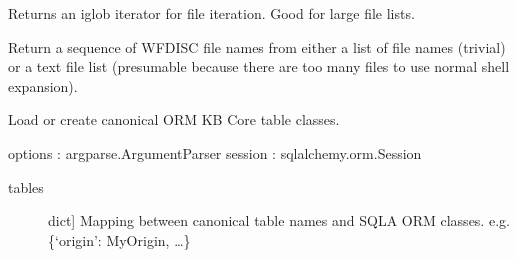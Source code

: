 \documentclass[letterpaper,10pt,english]{sphinxmanual}
\begin{document}

\begin{fulllineitems}
\label{\detokenize{infrapy.utils:infrapy.utils.files2db.dicts2rows}}
\end{fulllineitems}


\begin{fulllineitems}
\label{\detokenize{infrapy.utils:infrapy.utils.files2db.expand_glob}}
Returns an iglob iterator for file iteration. Good for large file lists.

\end{fulllineitems}


\begin{fulllineitems}
\label{\detokenize{infrapy.utils:infrapy.utils.files2db.get_files}}
Return a sequence of WFDISC file names from either a list of file names
(trivial) or a text file list (presumable because there are too many files
to use normal shell expansion).

\end{fulllineitems}


\begin{fulllineitems}
\label{\detokenize{infrapy.utils:infrapy.utils.files2db.get_or_create_tables}}
Load or create canonical ORM KB Core table classes.

options : argparse.ArgumentParser
session : sqlalchemy.orm.Session
\begin{description}
\item[{tables}] \leavevmode{[}dict{]}
Mapping between canonical table names and SQLA ORM classes.
e.g. \{‘origin’: MyOrigin, …\}

\end{description}

\end{fulllineitems}
\end{document}
